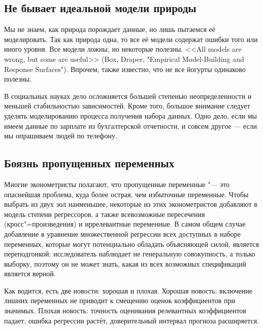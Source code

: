 \documentclass[11pt]{article}
\begin{document}

\subsection{Не бывает идеальной модели природы}


 
Мы не знаем, как природа порождает данные, но лишь пытаемся её моделировать. Так как природа одна, то все её модели содержат ошибки того или иного уровня.  Все модели ложны, но некоторые полезны. <<All models are wrong, but some are useful>> (Box, Draper, "Empirical Model-Building and Response Surfaces"). Впрочем, также известно, что не все йогурты одинаково полезны.

В социальных науках дело осложняется большей степенью неопределенности и меньшей стабильностью зависимостей. Кроме того, большое внимание следует уделять моделированию процесса получения набора данных. Одно дело, если мы имеем данные по зарплате из бухгалтерской отчетности, и совсем другое --- если мы опрашиваем людей по телефону. 



\subsection{Боязнь пропущенных переменных}

Многие эконометристы полагают, что пропущенные переменные "--- это опаснейшая проблема, куда более острая, чем избыточные переменные. Чтобы выбрать из двух зол наименьшее, некоторые из этих эконометристов добавляют в модель степени регрессоров, а также всевозможные пересечения (кросс"=произведения) и иррелевантные переменные. В самом общем случае добавление в уравнение множественной регрессии всех доступных в наборе переменных, которые могут потенциально обладать объясняющей силой, является переподгонкой: исследователь наблюдает не генеральную совокупность, а только выборку, поэтому он не может знать, какая из всех возможных спецификаций является верной.

Как водится, есть две новости: хорошая и плохая. Хорошая новость: включение лишних переменных не приводит к смещению оценок коэффициентов при значимых. Плохая новость: точность оценивания релевантных коэффициентов падает, ошибка регрессии растёт, доверительный интервал прогноза расширяется.
\end{document}
